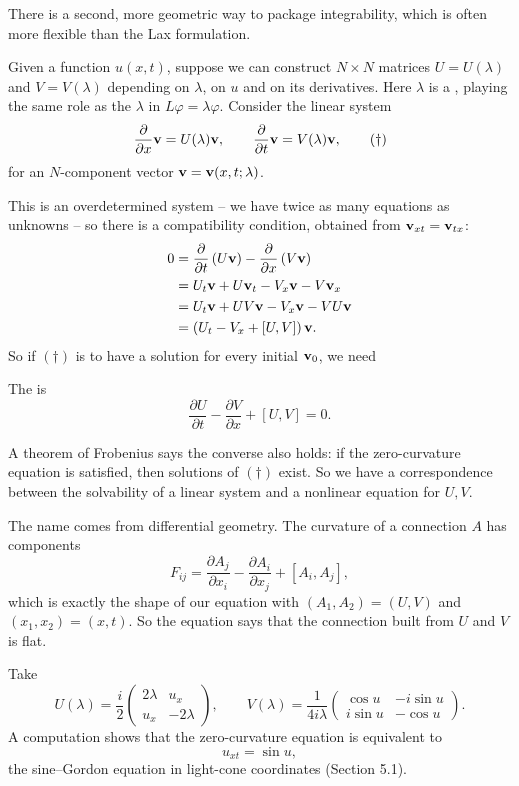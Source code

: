 \documentclass[a4paper]{scrartcl}
\begin{document}
There is a second, more geometric way to package integrability, which is often more flexible than the Lax formulation.

Given a function $u(x,t)$, suppose we can construct $N\times N$ matrices $U = U(\lambda)$ and $V = V(\lambda)$ depending on $\lambda$, on $u$ and on its derivatives. Here $\lambda$ is a , playing the same role as the $\lambda$ in $L\varphi = \lambda\varphi$. Consider the linear system
\begin{equation*}
\frac{\partial}{\partial x}\mathbf{v} = U(\lambda)\mathbf{v}, \qquad \frac{\partial}{\partial t}\mathbf{v} = V(\lambda)\mathbf{v},\tag{$\dagger$}
\end{equation*}
for an $N$-component vector $\mathbf{v} = \mathbf{v}(x,t;\lambda)$.

This is an overdetermined system -- we have twice as many equations as unknowns -- so there is a compatibility condition, obtained from $\mathbf{v}_{xt} = \mathbf{v}_{tx}$:
\begin{align*}
	0 &= \frac{\partial}{\partial t}\left(U\mathbf{v}\right) - \frac{\partial}{\partial x}\left(V\mathbf{v}\right)\\
	&= U_t\mathbf{v} + U\mathbf{v}_t - V_x\mathbf{v} - V\mathbf{v}_x\\
	&= U_t\mathbf{v} + UV\mathbf{v} - V_x\mathbf{v} - VU\mathbf{v}\\
	&= \left(U_t - V_x + [U,V]\right)\mathbf{v}.
\end{align*}
So if $(\dagger)$ is to have a solution for every initial $\mathbf{v}_0$, we need

\begin{definition}
	The  is
	$$
	\frac{\partial U}{\partial t} - \frac{\partial V}{\partial x} + [U, V] = 0.
	$$
\end{definition}

A theorem of Frobenius says the converse also holds: if the zero-curvature equation is satisfied, then solutions of $(\dagger)$ exist. So we have a correspondence between the solvability of a linear system and a nonlinear equation for $U, V$.

The name comes from differential geometry. The curvature of a connection $A$ has components
$$
F_{ij} = \frac{\partial A_j}{\partial x_i} - \frac{\partial A_i}{\partial x_j} + [A_i, A_j],
$$
which is exactly the shape of our equation with $(A_1, A_2) = (U, V)$ and $(x_1, x_2) = (x, t)$. So the equation says that the connection built from $U$ and $V$ is flat.

\begin{example}
	Take
	$$
	U(\lambda) = \frac{i}{2}\begin{pmatrix}2\lambda & u_x\\ u_x & -2\lambda\end{pmatrix}, \qquad V(\lambda) = \frac{1}{4i\lambda}\begin{pmatrix}\cos u & -i\sin u\\ i\sin u & -\cos u\end{pmatrix}.
	$$
	A computation shows that the zero-curvature equation is equivalent to
	$$
	u_{xt} = \sin u,
	$$
	the sine--Gordon equation in light-cone coordinates (Section 5.1).
\end{example}
\end{document}
